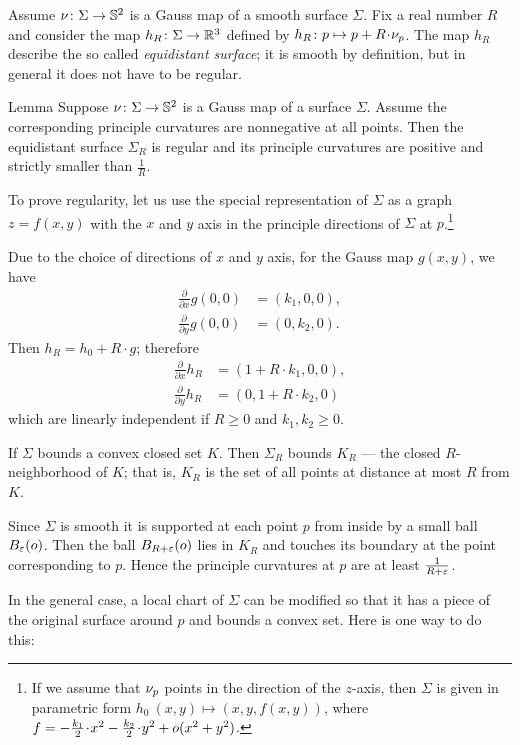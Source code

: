Assume $\nu\colon\Sigma\to \mathbb{S}^2$ is a Gauss map of a smooth surface $\Sigma$.
Fix a real number $R$ and consider the map $h_R\:\Sigma\z\to\RR^3$ defined by $h_R\:p\mapsto p+R\cdot\Norm_p$.
The map $h_R$ describe the so called \emph{equidistant surface};
it is smooth by definition, but in general it does not have to be regular.

\begin{thm}{Lemma}\label{lem:curc<1/R}
Suppose $\nu\colon\Sigma\to \mathbb{S}^2$ is a Gauss map of a surface $\Sigma$.
Assume the corresponding principle curvatures are nonnegative at all points. 
Then the equidistant surface $\Sigma_R$ is regular and its principle curvatures are positive and strictly smaller than $\tfrac1R$.
\end{thm}

To prove regularity, let us use the special representation of $\Sigma$ as a graph $z=f(x,y)$ with the $x$ and $y$ axis in the principle directions of $\Sigma$ at $p$.\footnote{If we assume that $\nu_p$ points in the direction of the $z$-axis, then $\Sigma$ is given in parametric form 
$h_0\:(x,y)\mapsto (x,y,f(x,y))$,
where $f\z=-\tfrac{k_1}2\cdot x^2-\tfrac{k_2}2\cdot y^2+o(x^2+y^2)$.}

Due to the choice of directions of $x$ and $y$ axis,
for the Gauss map $g(x,y)$, we have 
\begin{align*}
\tfrac{\partial}{\partial x}g(0,0)&=(k_1,0,0),
\\
\tfrac{\partial}{\partial y}g(0,0)&=(0,k_2,0).
\end{align*}
Then $h_R=h_0+R\cdot g$; therefore
\begin{align*}
\tfrac{\partial}{\partial x} h_R&=(1+R\cdot k_1,0,0),
\\
\tfrac{\partial}{\partial y} h_R&=(0,1+R\cdot k_2,0)
\end{align*}
which are linearly independent if $R\ge0$ and $k_1,k_2\ge 0$. 

If $\Sigma$ bounds a convex closed set $K$.
Then $\Sigma_R$ bounds $K_R$ --- the closed $R$-neighborhood of $K$;
that is, $K_R$ is the set of all points at distance at most $R$ from $K$.

Since $\Sigma$ is smooth it is supported at each point $p$ from inside by a small ball $B_\varepsilon(o)$.
Then the ball $B_{R+\varepsilon}(o)$ lies in $K_R$ and touches its boundary at the point corresponding to $p$.
Hence the principle curvatures at $p$ are at least $\tfrac1{R+\varepsilon}$.

In the general case, a local chart of $\Sigma$ can be modified so that it has a piece of the original surface around $p$  and bounds a convex set.
Here is one way to do this:

